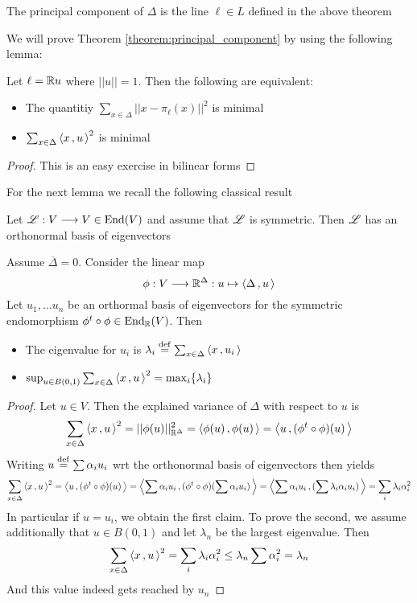 \documentclass{dsp}
\begin{document}
\begin{definition}
\label{definition:principal_component}
The principal component of $\Delta$ is the line $\ell \in L$ defined in the above theorem
\end{definition}
We will prove Theorem \ref{theorem:principal_component} by using the following lemma:
\begin{lemma}
\label{lemma:mse_variance}
Let $\ell = \mathbb{R}u$ where $\vert \vert u\vert \vert=1$. Then the following are equivalent:
\begin{itemize}
\item The quantitiy $\sum_{x \in \Delta} \vert\vert x- \pi_\ell(x)\vert\vert^2$ is minimal
\item  $\sum_{x \in \Delta} \left\langle x\,,u\, \right\rangle^2$ is minimal
\end{itemize}
\end{lemma}

\begin{proof}
This is an easy exercise in bilinear forms
\end{proof}

For the next lemma we recall the following classical result
\begin{theorem}
\label{theorem:spectral}
Let $\r{L}: V\mor V \in \End(V)$ and assume that $\r{L}$ is symmetric. Then $\r{L}$ has an orthonormal basis of eigenvectors
\end{theorem}

\begin{lemma}
\label{lemma:variance_eigenvalue}
Assume $\overline{\Delta}=0$. Consider the linear map
\[
\phi: V\longrightarrow \mathbb{R}^{\Delta}:u\mapsto \left\langle \Delta\,,u\, \right\rangle
\]
Let $u_1,\ldots u_n$ be an orthormal basis of eigenvectors for the symmetric endomorphism $\phi^t\circ \phi \in \operatorname{End}_{\mathbb{R}}(V)$.
Then
\begin{itemize}
\item The eigenvalue for $u_i$ is $\lambda_i \stackrel{\operatorname{def}}{=} \sum_{x\in \Delta}\left\langle x\,,u_i\, \right\rangle$
\item $\sup_{u\in B(0,1)} \sum_{x\in\Delta}\left\langle x\,,u\, \right\rangle^2=\max_i \{\lambda_i\}$
\end{itemize}
\end{lemma}

\begin{proof}
Let $u\in V$. Then the explained variance of $\Delta$ with respect to $u$ is
\[
\sum_{x\in\Delta}\left\langle x\,,u\, \right\rangle^2  = \vert\vert \phi(u)\vert\vert_{\mathbb{R}^\Delta}^2 = \left\langle \phi(u)\,,\phi(u)\, \right\rangle = \left\langle u\,,(\phi^t\circ \phi)(u)\, \right\rangle
\]
Writing $u\stackrel{\operatorname{def}}{=} \sum \alpha_iu_i$ wrt the orthonormal basis of eigenvectors then yields
\[
\sum_{x\in\Delta}\left\langle x\,,u\, \right\rangle^2  = \left\langle u\,,(\phi^t\circ \phi)(u)\, \right\rangle = \left\langle \sum\alpha_iu_i\,,(\phi^t\circ \phi)(\sum \alpha_i u_i )\, \right\rangle 
= \left\langle \sum\alpha_iu_i\,,(\sum \lambda_i\alpha_i u_i )\, \right\rangle = \sum_i \lambda_i\alpha_i^2
\]
In particular if $u=u_i$, we obtain the first claim. To prove the second, we assume additionally that $u \in B(0,1)$ and let $\lambda_n$ be the largest eigenvalue. Then
\[
\sum_{x\in\Delta}\left\langle x\,,u\, \right\rangle^2 =  \sum_i \lambda_i\alpha_i^2\le \lambda_n \sum \alpha_i^2 = \lambda_n
\]
And this value indeed gets reached by $u_n$
\end{proof}
\end{document}
